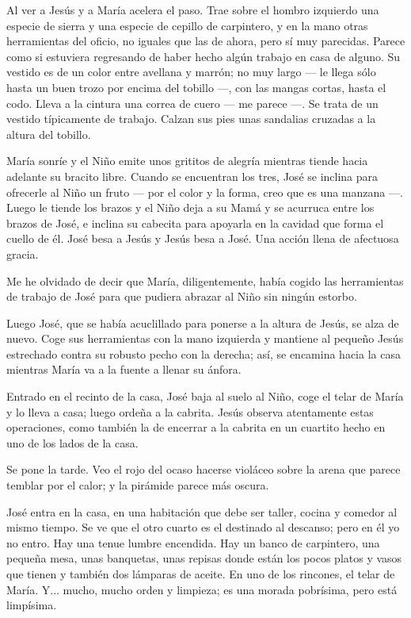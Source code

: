 \documentclass[12pt]{book} %
\begin{document}
Al ver a Jesús y a María acelera el paso. Trae sobre el hombro izquierdo una especie de sierra y una especie de cepillo de carpintero, y en la mano otras herramientas del oficio, no iguales que las de ahora, pero sí muy parecidas. Parece como si estuviera regresando de haber hecho algún trabajo en casa de alguno. Su vestido es de un color entre avellana y marrón; no muy largo — le llega sólo hasta un buen trozo por encima del tobillo —, con las mangas cortas, hasta el codo. Lleva a la cintura una correa de cuero — me parece —. Se trata de un vestido típicamente de trabajo. Calzan sus pies unas sandalias cruzadas a la altura del tobillo. 

María sonríe y el Niño emite unos grititos de alegría mientras tiende hacia adelante su bracito libre. Cuando se encuentran los tres, José se inclina para ofrecerle al Niño un fruto — por el color y la forma, creo que es una manzana —. Luego le tiende los brazos y el Niño deja a su Mamá y se acurruca entre los brazos de José, e inclina su cabecita para apoyarla en la cavidad que forma el cuello de él. José besa a Jesús y Jesús besa a José. Una acción llena de afectuosa gracia. 

Me he olvidado de decir que María, diligentemente, había cogido las herramientas de trabajo de José para que pudiera abrazar al Niño sin ningún estorbo. 

Luego José, que se había acuclillado para ponerse a la altura de Jesús, se alza de nuevo. Coge sus herramientas con la mano izquierda y mantiene al pequeño Jesús estrechado contra su robusto pecho con la derecha; así, se encamina hacia la casa mientras María va a la fuente a llenar su ánfora. 

Entrado en el recinto de la casa, José baja al suelo al Niño, coge el telar de María y lo lleva a casa; luego ordeña a la cabrita. Jesús observa atentamente estas operaciones, como también la de encerrar a la cabrita en un cuartito hecho en uno de los lados de la casa. 

Se pone la tarde. Veo el rojo del ocaso hacerse violáceo sobre la arena que parece temblar por el calor; y la pirámide parece más oscura. 

José entra en la casa, en una habitación que debe ser taller, cocina y comedor al mismo tiempo. Se ve que el otro cuarto es el destinado al descanso; pero en él yo no entro. Hay una tenue lumbre encendida. Hay un banco de carpintero, una pequeña mesa, unas banquetas, unas repisas donde están los pocos platos y vasos que tienen y también dos lámparas de aceite. En uno de los rincones, el telar de María. Y... mucho, mucho orden y limpieza; es una morada pobrísima, pero está limpísima. 
\end{document}
